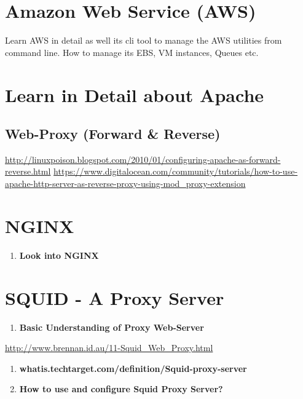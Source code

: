 \documentclass[letterpaper,10pt,english]{sphinxmanual}
\begin{document}
\section{Amazon Web Service (AWS)}
\label{week-14:amazon-web-service-aws}
Learn AWS in detail as well its cli tool to manage the AWS utilities from command line.
How to manage its EBS, VM instances, Queues etc.


\section{Learn in Detail about Apache}
\label{week-14:learn-in-detail-about-apache}

\subsection{Web-Proxy (Forward \& Reverse)}
\label{week-14:web-proxy-forward-reverse}
\href{http://linuxpoison.blogspot.com/2010/01/configuring-apache-as-forward-reverse.html}{http://linuxpoison.blogspot.com/2010/01/configuring-apache-as-forward-reverse.html}
\href{https://www.digitalocean.com/community/tutorials/how-to-use-apache-http-server-as-reverse-proxy-using-mod\_proxy-extension}{https://www.digitalocean.com/community/tutorials/how-to-use-apache-http-server-as-reverse-proxy-using-mod\_proxy-extension}


\section{NGINX}
\label{week-14:nginx}\begin{enumerate}
\item {} 
\textbf{Look into NGINX}

\end{enumerate}


\section{SQUID - A Proxy Server}
\label{week-14:squid-a-proxy-server}\begin{enumerate}
\item {} 
\textbf{Basic Understanding of Proxy Web-Server}

\end{enumerate}

\href{http://www.brennan.id.au/11-Squid\_Web\_Proxy.html}{http://www.brennan.id.au/11-Squid\_Web\_Proxy.html}
\begin{enumerate}
\item {} 
\textbf{whatis.techtarget.com/definition/Squid-proxy-server}

\item {} 
\textbf{How to use and configure Squid Proxy Server?}

\end{enumerate}
\end{document}
